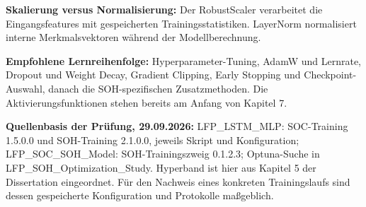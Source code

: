 \textbf{Skalierung versus Normalisierung:} Der RobustScaler verarbeitet die Eingangsfeatures mit gespeicherten Trainingsstatistiken. LayerNorm normalisiert interne Merkmalsvektoren während der Modellberechnung.

\textbf{Empfohlene Lernreihenfolge:} Hyperparameter-Tuning, AdamW und Lernrate, Dropout und Weight Decay, Gradient Clipping, Early Stopping und Checkpoint-Auswahl, danach die SOH-spezifischen Zusatzmethoden. Die Aktivierungsfunktionen stehen bereits am Anfang von Kapitel 7.

\textbf{Quellenbasis der Prüfung, 29.09.2026:} LFP\_LSTM\_MLP: SOC-Training 1.5.0.0 und SOH-Training 2.1.0.0, jeweils Skript und Konfiguration; LFP\_SOC\_SOH\_Model: SOH-Trainingszweig 0.1.2.3; Optuna-Suche in LFP\_SOH\_Optimization\_Study. Hyperband ist hier aus Kapitel 5 der Dissertation eingeordnet. Für den Nachweis eines konkreten Trainingslaufs sind dessen gespeicherte Konfiguration und Protokolle maßgeblich.
\clearpage
